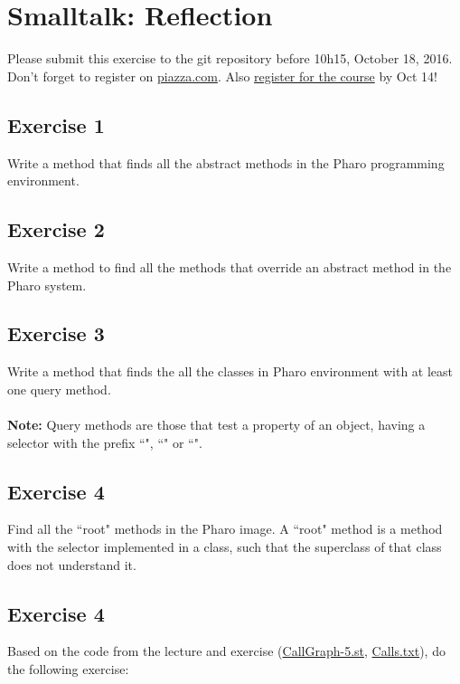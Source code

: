 \documentclass [11pt, a4wide, twoside]{article}
\begin{document}
\section*{Smalltalk: Reflection}


Please submit this exercise to the git repository before 10h15, October 18, 2016.
Don't forget to register on \href{https://piazza.com/unibe.ch/fall2016/sma21045}{piazza.com}.
Also \href{https://www-academia.unine.ch/imoniteur_pbol/PORTAL3S.htm}{register for the course} by Oct 14!

\subsection*{Exercise 1}
Write a method that finds all the abstract methods in the Pharo programming environment.

\subsection*{Exercise 2}
Write a method to find all the methods that override an abstract method in the Pharo system.

\subsection*{Exercise 3}
Write a method that finds the all the classes in Pharo environment with at least one query method.\\ \\
\textbf{Note:} Query methods are those that test a property of an object, \eg having a selector with the prefix ``", ``" or ``".

\subsection*{Exercise 4}
Find all the ``root" methods in the Pharo image. A ``root" method is a method with the selector implemented in a class, such that the superclass of that class does not understand it.

\subsection*{Exercise 4}
Based on the code from the lecture and exercise (\href{http://scg.unibe.ch/download/lectures/sma/Demos/CallGraphDemo/CallGraph-5.st}{CallGraph-5.st}, \href{http://scg.unibe.ch/download/lectures/sma/Demos/CallGraphDemo/Calls.txt}{Calls.txt}), do the following exercise:
\end{document}

